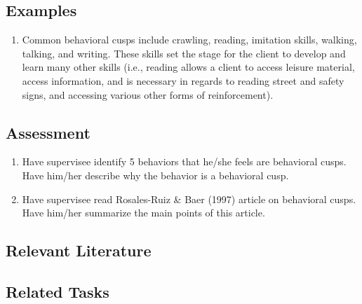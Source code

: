 \subsection{Examples}
\begin{enumerate}
\item Common behavioral cusps include crawling, reading, imitation skills, walking, talking, and writing. These skills set the stage for the client to develop and learn many other skills (i.e., reading allows a client to access leisure material, access information, and is necessary in regards to reading street and safety signs, and accessing various other forms of reinforcement).
\end{enumerate}
%
\subsection{Assessment}
\begin{enumerate}
\item Have supervisee identify 5 behaviors that he/she feels are behavioral cusps. Have him/her describe why the behavior is a behavioral cusp.
\item Have supervisee read Rosales-Ruiz \& Baer (1997) article on behavioral cusps. Have him/her summarize the main points of this article.
%
\end{enumerate}
%
\subsection{Relevant Literature}
\begin{refsection}
\nocite{test,alang2017police,clayton2018black}
\printbibliography[heading=none]
\end{refsection}
%
\subsection{Related Tasks}
\fourgEight{}\\
\fouriOne{}\\
\fouriSix{}\\
\fourjOne{}\\
\fourjEight{}\\
\fourjFourteen{}\\
\fourFKTen{}\\
%
%
%
%
%
%
%
%
